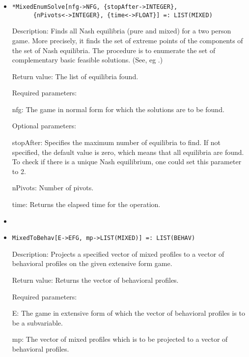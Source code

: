 \begin{itemize}
\item
\protect \large \begin{verbatim}
*MixedEnumSolve[nfg->NFG, {stopAfter->INTEGER},
      {nPivots<->INTEGER}, {time<->FLOAT}] =: LIST(MIXED)
\end{verbatim}\normalsize

\bd
\item
[Description:] Finds all Nash equilibria (pure and mixed) for a two
person game.  More precisely, it finds the set of extreme points of
the components of the set of Nash equilibria.  The procedure is to
enumerate the set of complementary basic feasible solutions. (See, eg
\cite[1964]{Man:64}.)
\item
[Return value:] The list of equilibria found.
\item
[Required parameters:]
\bd
\item
[nfg:] The game in normal form for which the solutions are to be found.  
\ed
\item
[Optional parameters:]\hfil\null

\bd
\item
[stopAfter:] Specifies the maximum number of equilibria to find.  If
not specified, the default value is zero, which means that all
equilibria are found.  To check if there is a unique Nash equilibrium,
one could set this parameter to 2.
\item
[nPivots:] Number of pivots. 
\item
[time:] Returns the elapsed time for the operation.
\item
\ed
\ed

\item
\protect \large \begin{verbatim}
MixedToBehav[E->EFG, mp->LIST(MIXED)] =: LIST(BEHAV)
\end{verbatim}\normalsize

\bd
\item
[Description:] Projects a specified vector of mixed profiles to a
vector of behavioral profiles on the given extensive form game.
\item
[Return value:] Returns the vector of behavioral profiles.
\item
[Required parameters:]\hfil\null

\bd
\item
[E:] The game in extensive form of which the vector of behavioral
profiles is to be a subvariable.
\item
[mp:] The vector of mixed profiles which is to be projected to a
vector of behavioral profiles.
\ed


\end{itemize}
